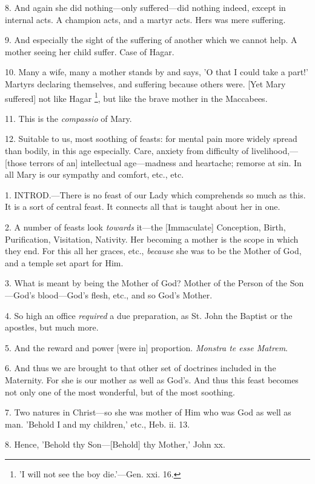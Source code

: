 8. And again she did nothing—only
suffered—did nothing indeed, except in internal acts. A champion
acts, and a martyr acts. Hers was mere suffering.

9. And especially the sight of the suffering of
another which we cannot help. A mother seeing her child suffer. Case
of Hagar.

10. Many a wife, many a mother stands by and
says, 'O that I could take a part!' Martyrs declaring themselves, and
suffering because others were. [Yet Mary suffered] not like Hagar \footnote{'I will not see the boy
die.'—Gen. xxi. 16.}, but like the brave mother in the Maccabees.

11. This is the \emph{compassio} of Mary.

12. Suitable to us, most soothing of feasts: for
mental pain more widely spread than bodily, in this age especially.
Care, anxiety from difficulty of livelihood,—[those terrors of an]
intellectual age—madness and heartache; remorse at sin. In all Mary
is our sympathy and comfort, etc., etc.


1. INTROD.—There
is no feast of our Lady which comprehends so much as this. It is a
sort of central feast. It connects all that is taught about her in
one.

2. A number of feasts look \emph{towards}
it—the [Immaculate] Conception, Birth, Purification, Visitation,
Nativity. Her becoming a mother is the scope in which they end. For
this all her graces, etc., \emph{because} she was to be the Mother of
God, and a temple set apart for Him.

3. What is meant by being the Mother of God?
Mother of the Person of the Son—God's blood—God's flesh, etc., and
so God's Mother.

4. So high an office \emph{required} a due
preparation, as St. John the Baptist or the apostles, but much more.

5. And the reward and power [were in] proportion.
\emph{Monstra te esse Matrem}.

6. And thus we are brought to that other set of
doctrines included in the Maternity. For she is our mother as well as
God's. And thus this feast becomes not only one of the most wonderful,
but of the most soothing.

7. Two natures in Christ—so she was mother of
Him who was God as well as man. 'Behold I and my children,' etc., Heb.
ii. 13.

8. Hence, 'Behold thy Son—[Behold] thy Mother,'
John xx.

